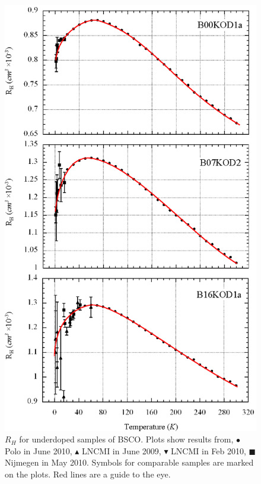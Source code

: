 

\begin{figure}[htbp]
	\begin{center}
		\includegraphics[scale=0.9]{Chapter-HallBSCO/Figures/HallIndividual/HallIndividualOD}
		\caption{$R_H$ for underdoped samples of \ac{BSCO}. Plots show results from, $\bullet$ Polo in June 2010, $\blacktriangle$ \ac{LNCMI} in June 2009, $\blacktriangledown$ \ac{LNCMI} in Feb 2010, $\blacksquare$ Nijmegen in May 2010. Symbols for comparable samples are marked on the plots. Red lines are a guide to the eye.}
		\label{Fig:ExpH:HallIndividualOD}
	\end{center}
\end{figure}

